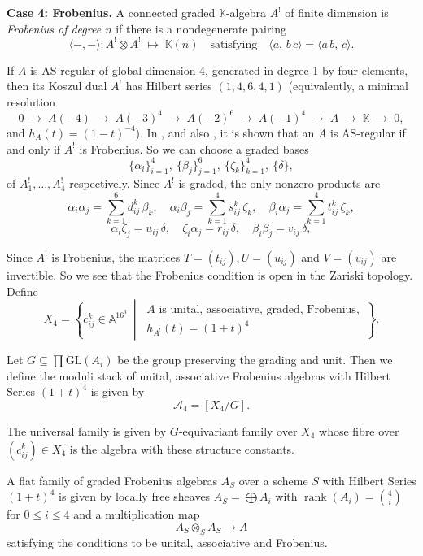 \documentclass{amsart}
\DeclareMathOperator{\rank}{rank}
\begin{document}
\textbf{Case 4: Frobenius.}
A connected graded \(\mathbb{K}\)-algebra \(A^!\) of finite dimension is \emph{Frobenius of degree \(n\)} if there is a nondegenerate pairing
\[
\langle-,-\rangle : A^!\otimes A^! \;\longmapsto\; \mathbb{K}(n) \quad \text{satisfying} \quad  
\langle a,\,b\,c\rangle = \langle a\,b,\,c\rangle.
\]


If \(A\) is AS-regular of global dimension 4, generated in degree 1 by four elements, then its Koszul dual \(A^!\) has Hilbert series \((1,4,6,4,1)\) (equivalently, a minimal resolution
\[
0\;\to\;A(-4)\;\to\;A(-3)^{4}\;\to\;A(-2)^{6}\;\to\;A(-1)^{4}\;\to\;A\;\to\;\mathbb{K}\;\to\;0,
\]
and \(h_A(t)=(1-t)^{-4}\)).  In \cite[Thm.~4.3 and Prop.~5.10]{MR1388568}, and also \cite[Cor.~D]{lu2007koszul}, it is shown that an \(A\) is AS-regular if and only if \(A^!\) is Frobenius.  So we can choose a graded bases
\[
\{\alpha_i\}_{i=1}^4,\ 
\{\beta_j\}_{j=1}^6,\ 
\{\zeta_k\}_{k=1}^4,\ 
\{\delta\},
\]
of $A_1^!,\ldots,A_4^!$ respectively.  Since $A^!$ is graded, the only nonzero products are
\[
\alpha_i\alpha_j=\sum_{k=1}^6d_{ij}^k\,\beta_k,\quad
\alpha_i\beta_j=\sum_{k=1}^4s_{ij}^k\,\zeta_k,\quad
\beta_i\alpha_j=\sum_{k=1}^4t_{ij}^k\,\zeta_k,
\]
\[
\alpha_i\zeta_j=u_{ij}\,\delta,\quad
\zeta_i\alpha_j=r_{ij}\,\delta,\quad
\beta_i\beta_j=v_{ij}\,\delta,
\]

Since $A^!$ is Frobenius, 
the matrices \(T=(t_{ij}), U =(u_{ij})\) and \(V=(v_{ij})\) are invertible.
 So we see that the Frobenius condition is open in the Zariski topology.
 Define
\[
X_4 = \left\{ c_{ij}^k \in \mathbb{A}^{16^3} \ \middle| \
\begin{array}{l}
A \text{ is unital, associative, graded, Frobenius}, \\
h_{A^!}(t) = (1 + t)^4
\end{array} \right\}.
\]

Let \( G \subseteq \prod \mathrm{GL}(A_i) \) be the group preserving the grading and unit. Then we define the moduli stack of unital, associative Frobenius algebras with Hilbert Series $(1+t)^4$ is given by
\[
\mathcal{A}_4 = [X_4 / G].
\]

The universal family is given by $G$-equivariant family over $X_4$ whose fibre over $(c_{ij}^k) \in X_4$ is the algebra with these structure constants.

A flat family of graded Frobenius algebras $A_S$ over a scheme $S$ with Hilbert Series $(1+t)^4$ is given by locally free sheaves $A_S = \bigoplus A_i$ with $\rank(A_i) = \binom{4}{i}$ for $0 \leq i \leq 4$ and a multiplication map $$A_S \otimes_S A_S \to A$$ satisfying the conditions to be unital, associative and Frobenius.
\end{document}
